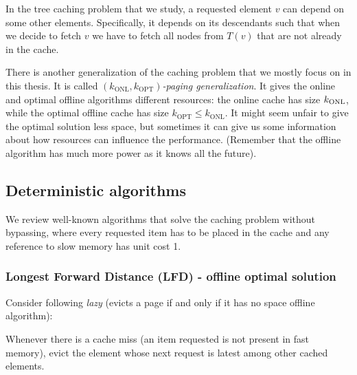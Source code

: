 In the tree caching problem that we study, a requested element $v$ can depend 
on some other elements. Specifically, it depends on its descendants such that 
when we decide to fetch $v$ we have to fetch all nodes from $T(v)$ 
that are not already in the cache.

There is another generalization of the caching problem that we mostly focus on in 
this thesis. It is called 
$(k_{\mathrm{ONL}}, k_{\mathrm{OPT}})$\textit{-paging generalization}. It gives 
the online and optimal offline algorithms different resources: the online cache has
size $k_{\mathrm{ONL}}$, while the optimal offline cache has size 
$k_{\mathrm{OPT}} \leq k_{\mathrm{ONL}}$. It might seem 
unfair to give the optimal solution less space, but sometimes it can give us 
some information about how resources can influence the performance. (Remember 
that the offline algorithm has much more power as it knows all the future).

\subsection{Deterministic algorithms}
We review well-known algorithms that solve the caching problem without bypassing, 
where every requested item has to be placed in the cache and any reference to 
slow memory has unit cost 1.
\subsubsection{Longest Forward Distance (LFD) - offline optimal solution}
Consider following \textit{lazy} (evicts a page if and only if it has no space  
offline algorithm): 
\begin{myalgo}
Whenever there is a cache miss (an item requested is not 
present in fast memory), evict the element whose next request is latest among other 
cached elements.
\end{myalgo}

